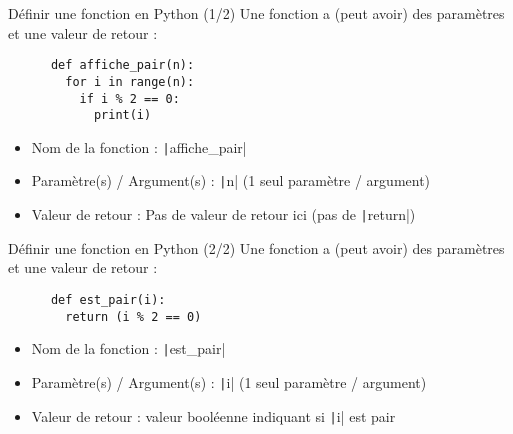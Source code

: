\documentclass[10pt]{beamer}
\begin{document}
\begin{frame}[fragile]{Définir une fonction en Python (1/2)}  
  Une fonction a (peut avoir) des paramètres et une valeur de retour :
    
    \begin{beamercodeblock}
      \begin{verbatim}
      def affiche_pair(n):
        for i in range(n):
          if i % 2 == 0:
            print(i)
      \end{verbatim}
    \end{beamercodeblock}

  \begin{itemize}
    \item Nom de la fonction : \texttt|affiche_pair|
    \item Paramètre(s) / Argument(s) : \texttt|n| (1 seul paramètre / argument)
    \item Valeur de retour : Pas de valeur de retour ici (pas de \texttt|return|)
  \end{itemize}
\end{frame} 

\begin{frame}[fragile]{Définir une fonction en Python (2/2)}  
  Une fonction a (peut avoir) des paramètres et une valeur de retour :
    
    \begin{beamercodeblock}
      \begin{verbatim}
      def est_pair(i):
        return (i % 2 == 0)
      \end{verbatim}
    \end{beamercodeblock}

  \begin{itemize}
    \item Nom de la fonction : \texttt|est_pair|
    \item Paramètre(s) / Argument(s) : \texttt|i| (1 seul paramètre / argument)
    \item Valeur de retour : valeur booléenne indiquant si \texttt|i| est pair
  \end{itemize}
\end{frame} 
\end{document}
